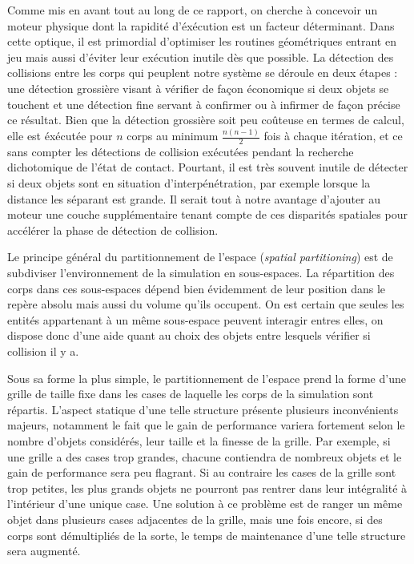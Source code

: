 Comme mis en avant tout au long de ce rapport, on cherche à concevoir
un moteur physique dont la rapidité d'éxécution est un facteur
déterminant. Dans cette optique, il est primordial d'optimiser les
routines géométriques entrant en jeu mais aussi d'éviter leur
exécution inutile dès que possible. La détection des collisions entre
les corps qui peuplent notre système se déroule en deux étapes : une
détection grossière visant à vérifier de façon économique si deux
objets se touchent et une détection fine servant à confirmer ou à
infirmer de façon précise ce résultat. Bien que la détection grossière
soit peu coûteuse en termes de calcul, elle est éxécutée pour $n$
corps au minimum $\frac{n(n-1)}{2}$ fois à chaque itération, et ce
sans compter les détections de collision exécutées pendant la
recherche dichotomique de l'état de contact. Pourtant, il est très
souvent inutile de détecter si deux objets sont en situation
d'interpénétration, par exemple lorsque la distance les séparant est
grande. Il serait tout à notre avantage d'ajouter au moteur une couche
supplémentaire tenant compte de ces disparités spatiales pour
accélérer la phase de détection de collision.

Le principe général du partitionnement de l'espace (\textit{spatial
  partitioning}) est de subdiviser l'environnement de la simulation en
sous-espaces. La répartition des corps dans ces sous-espaces dépend
bien évidemment de leur position dans le repère absolu mais aussi du
volume qu'ils occupent. On est certain que seules les entités
appartenant à un même sous-espace peuvent interagir entres elles, on
dispose donc d'une aide quant au choix des objets entre lesquels
vérifier si collision il y a.

Sous sa forme la plus simple, le partitionnement de l'espace prend la
forme d'une grille de taille fixe dans les cases de laquelle les corps
de la simulation sont répartis. L'aspect statique d'une telle
structure présente plusieurs inconvénients majeurs, notamment le fait
que le gain de performance variera fortement selon le nombre d'objets
considérés, leur taille et la finesse de la grille. Par exemple, si
une grille a des cases trop grandes, chacune contiendra de nombreux
objets et le gain de performance sera peu flagrant. Si au contraire
les cases de la grille sont trop petites, les plus grands objets ne
pourront pas rentrer dans leur intégralité à l'intérieur d'une unique
case. Une solution à ce problème est de ranger un même objet dans
plusieurs cases adjacentes de la grille, mais une fois encore, si des
corps sont démultipliés de la sorte, le temps de maintenance d'une
telle structure sera augmenté.

